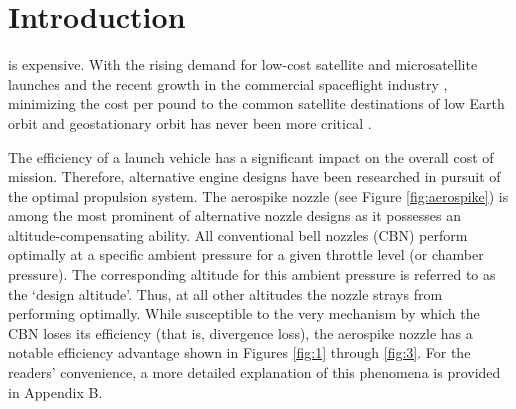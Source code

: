 \documentclass[conference]{IEEEtran} %
\begin{document}
	
	\section{Introduction}
	\label{sec:introduction}
	
	 is expensive. With the rising demand for low-cost satellite and microsatellite launches and the recent growth in the commercial spaceflight industry \cite{FAAAeroForecast2016, AlJazeeraSpaceArticle}, minimizing the cost per pound to the common satellite destinations of low Earth orbit and geostationary orbit has never been more critical \cite{LA-Times_InvestmentInSpace}.
	
	The efficiency of a launch vehicle has a significant impact on the overall cost of mission. Therefore, alternative engine designs have been researched in pursuit of the optimal propulsion system. The aerospike nozzle (see Figure \ref{fig:aerospike}) is among the most prominent of alternative nozzle designs as it possesses an altitude-compensating ability. All conventional bell nozzles (CBN) perform optimally at a specific ambient pressure for a given throttle level (or chamber pressure). The corresponding altitude for this ambient pressure is referred to as the `design altitude'. Thus, at all other altitudes the nozzle strays from performing optimally. While susceptible to the very mechanism by which the CBN loses its efficiency (that is, divergence loss), the aerospike nozzle has a notable efficiency advantage shown in Figures \ref{fig:1} through \ref{fig:3}. For the readers' convenience, a more detailed explanation of this phenomena is provided in Appendix B.
	
\end{document}
